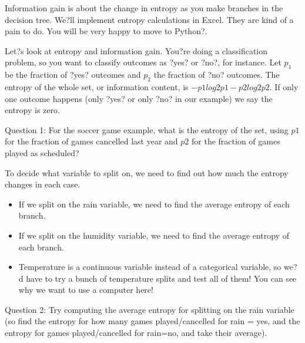 \documentclass[10pt]{article}
\begin{document}
Information gain is about the change in entropy as you make branches in the decision tree.
We?ll implement entropy calculations in Excel. They are kind of a pain to do. You will be very happy to move to Python?.


Let?s look at entropy and information gain. 
You?re doing a classification problem, so you want to classify outcomes as ?yes? or ?no?, for instance. Let $p_1$ be the fraction of ?yes? outcomes and $p_2$ the fraction of ?no? outcomes.
The entropy of the whole set, or information content, is $-p1log2 p1- p2log2 p2$.
If only one outcome happens (only ?yes? or only ?no? in our example) we say the entropy is zero. 

Question 1: For the soccer game example, what is the entropy of the set, using $p1$ for the fraction of games cancelled last year and $p2$ for the fraction of games played as scheduled?







To decide what variable to split on, we need to find out how much the entropy changes in each case. 
\begin{itemize}
\item If we split on the rain variable, we need to find the average entropy of each branch.
\item If we split on the humidity variable, we need to find the average entropy of each branch.
\item Temperature is a continuous variable instead of a categorical variable, so we?d have to try a bunch of temperature splits and test all of them! You can see why we want to use a computer here!
\end{itemize}
Question 2: Try computing the average entropy for splitting on the rain variable (so find the entropy for how many games played/cancelled for rain = yes, and the entropy for games played/cancelled for rain=no, and take their average).


\vfill

\pagebreak
\end{document}
